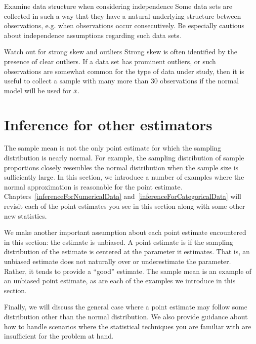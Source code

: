\begin{caution}
{Examine data structure when considering independence}
{Some data sets are collected in such a way that they have a natural underlying structure between observations, e.g. when observations occur consecutively. Be especially cautious about independence assumptions regarding such data sets.}
\end{caution}

\begin{caution}{Watch out for strong skew and outliers}
{Strong skew is often identified by the presence of clear outliers. If a data set has prominent outliers, or such observations are somewhat common for the type of data under study, then it is useful to collect a sample with many more than 30 observations if the normal model will be used for $\bar{x}$.}
\end{caution}



\section{Inference for other estimators}
\label{aFrameworkForInference}

The sample mean is not the only point estimate for which the sampling distribution is nearly normal. For example, the sampling distribution of sample proportions closely resembles the normal distribution when the sample size is sufficiently large. In this section, we introduce a number of examples where the normal approximation is reasonable for the point estimate. Chapters~\ref{inferenceForNumericalData} and~\ref{inferenceForCategoricalData} will revisit each of the point estimates you see in this section along with some other new statistics.

We make another important assumption about each point estimate encountered in this section: the estimate is unbiased. A point estimate is  if the sampling distribution of the estimate is centered at the parameter it estimates. That is, an unbiased estimate does not naturally over or underestimate the parameter. Rather, it tends to provide a ``good'' estimate. The sample mean is an example of an unbiased point estimate, as are each of the examples we introduce in this section.

Finally, we will discuss the general case where a point estimate may follow some distribution other than the normal distribution. We also provide guidance about how to handle scenarios where the statistical techniques you are familiar with are insufficient for the problem at hand.


